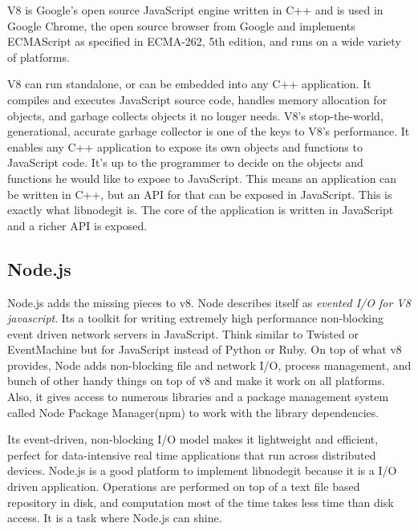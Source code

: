 V8 is Google\’'s open source JavaScript engine written in C++ and is used in
Google Chrome, the open source browser from Google and implements ECMAScript as
specified in ECMA-262, 5th edition, and runs on a wide variety of platforms.

V8 can run standalone, or can be embedded into any C++ application. It compiles
and executes JavaScript source code, handles memory allocation for objects, and
garbage collects objects it no longer needs. V8’s stop-the-world, generational,
accurate garbage collector is one of the keys to V8’s performance. It enables
any C++ application to expose its own objects and functions to JavaScript code.
It’s up to the programmer to decide on the objects and functions he would like
to expose to JavaScript. This means an application can be written in C++, but an
API for that can be exposed in JavaScript. This is exactly what libnodegit is.
The core of the application is written in JavaScript and a richer API is
exposed.

\subsection{Node.js }

Node.js adds the missing pieces to v8. Node describes itself as \textit{evented
  I/O for V8 javascript}. Its a toolkit for writing extremely high performance
non-blocking event driven network servers in JavaScript. Think similar to
Twisted\cite{twisted} or EventMachine\cite{eventmachine} but for JavaScript
instead of Python or Ruby. On top of what v8 provides, Node adds non-blocking
file and network I/O, process management, and bunch of other handy things on top
of v8 and make it work on all platforms. Also, it gives access to numerous
libraries and a package management system called Node Package
Manager(npm)\cite{npm} to work with the library dependencies.

Its event-driven, non-blocking I/O model makes it lightweight and efficient,
perfect for data-intensive real time applications that run across distributed
devices. Node.js is a good platform to implement libnodegit because it is a I/O
driven application. Operations are performed on top of a text file based
repository in disk, and computation most of the time takes less time than disk
access. It is a task where Node.js can shine.
